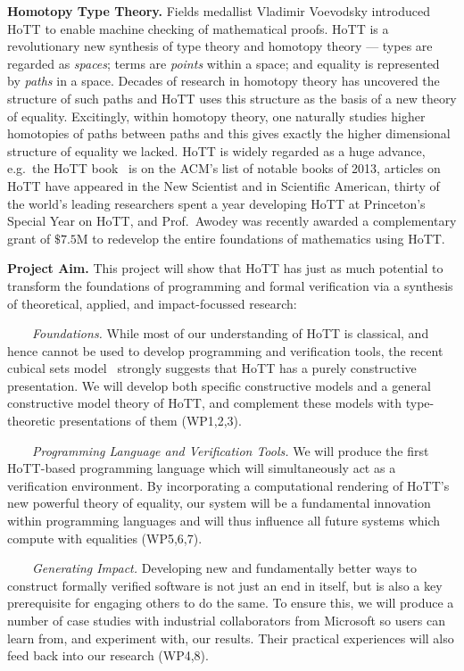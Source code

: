 \documentclass[a4paper,11pt]{article}
\newcommand{\eg}{{e.g.}\ }
\begin{document}
{\bf Homotopy Type Theory.} Fields medallist Vladimir Voevodsky
introduced HoTT to enable machine checking of mathematical proofs.
HoTT is a revolutionary new synthesis of type theory and homotopy
theory --- types are regarded as \emph{spaces}; terms are
\emph{points} within a space; and equality is represented by
\emph{paths} in a space. Decades of research in homotopy theory has
uncovered the structure of such paths and HoTT uses this structure as
the basis of a new theory of equality. Excitingly, within homotopy
theory, one naturally studies higher homotopies of paths between paths
and this gives exactly the higher dimensional structure of equality we
lacked.  HoTT is widely regarded as a huge advance, \eg the HoTT
book~\cite{hott-book} is on the ACM's list of notable books of 2013,
articles on HoTT have appeared in the New Scientist and in Scientific
American, thirty of the world's leading researchers spent a year
developing HoTT at Princeton's Special Year on HoTT, and Prof.\ Awodey
was recently awarded a complementary grant of $\$ 7.5$M to redevelop
the entire foundations of mathematics using HoTT.


{\bf Project Aim.}  This project will show that HoTT has just as much
potential to transform the foundations of programming and formal
verification via a synthesis of theoretical, applied, and
impact-focussed research:



$\;\;\; \;\;\;$ {\em Foundations.} 
While most of our understanding of HoTT is classical, and hence
cannot be used to develop programming and verification
tools, the recent cubical sets model~\cite{BezemM:cubsmt,nominal} 
strongly suggests that HoTT has a purely constructive
presentation. We will develop both specific constructive models and a
general constructive model theory of HoTT, and complement these models
with type-theoretic presentations of them (WP1,2,3).

$\;\;\;\;\;\;$ {\em Programming Language and Verification Tools.}  We
will produce the first HoTT-based programming language which will
simultaneously act as a verification environment. By incorporating a
computational rendering of HoTT's new powerful theory of equality, our system will
be a fundamental innovation within programming languages and will thus
influence all future systems which compute with equalities (WP5,6,7).

  $\;\;\;\;\;\;$ {\em Generating Impact.} Developing new and
  fundamentally better ways to construct formally verified software is
  not just an end in itself, but is also a key prerequisite 
  for engaging others to do the same.  To ensure this, we will produce
  a number of case studies with industrial collaborators from
  Microsoft so users can learn from, and experiment with, our
  results. Their practical experiences will also feed back into our
  research (WP4,8).
\end{document}
